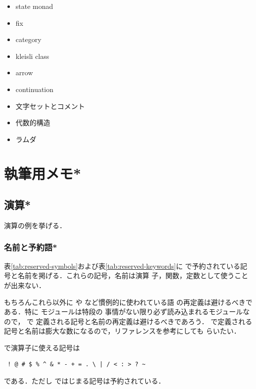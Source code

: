 \documentclass[a5paper,twoside,fleqn,draft]{jsbook}
\begin{document}
\begin{itemize}
\item state monad
\item fix
\item category
\item kleisli class
\item arrow
\item continuation
\item 文字セットとコメント
\item 代数的構造
\item ラムダ
\end{itemize}

\part{執筆用メモ*}



\chapter{演算*}
\label{ch:arithmetic}

\begin{leader}
演算の例を挙げる．
\end{leader}


\section{名前と予約語*}

表\ref{tab:reserved-symbols}および表\ref{tab:reserved-keywords}に
\haskell で予約されている記号と名前を掲げる．これらの記号，名前は演算
子，関数，定数として使うことが出来ない．

もちろんこれら以外に \code{+} や  など慣例的に使われている語
の再定義は避けるべきである．特に  モジュールは特段の
事情がない限り必ず読み込まれるモジュールなので， で
定義される記号と名前の再定義は避けるべきであろう．
で定義される記号と名前は膨大な数になるので，リファレンスを参考にしても
らいたい．

\haskell で演算子に使える記号は
\begin{verbatim}
 ! @ # $ % ^ & * - + = . \ | / < : > ? ~
\end{verbatim}%
である．ただし \code{:} ではじまる記号は予約されている．

\end{document}
